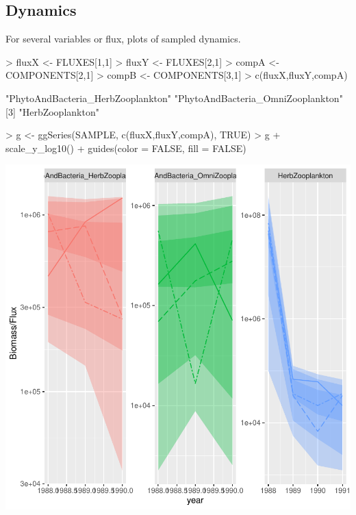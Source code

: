\documentclass{article}
\begin{document}
\clearpage

\subsection{Dynamics}

For several variables or flux, plots of sampled dynamics. 
\begin{Schunk}
\begin{Sinput}
> fluxX <- FLUXES[1,1]
> fluxY <- FLUXES[2,1]
> compA <- COMPONENTS[2,1] 
> compB <- COMPONENTS[3,1] 
> c(fluxX,fluxY,compA)
\end{Sinput}
\begin{Soutput}
[1] "PhytoAndBacteria_HerbZooplankton" "PhytoAndBacteria_OmniZooplankton"
[3] "HerbZooplankton"                 
\end{Soutput}
\end{Schunk}

\begin{Schunk}
\begin{Sinput}
> g <- ggSeries(SAMPLE, c(fluxX,fluxY,compA), TRUE)
> g + scale_y_log10() + guides(color = FALSE, fill = FALSE)
\end{Sinput}
\end{Schunk}
\includegraphics{barents_SM-017}

\clearpage
\end{document}
